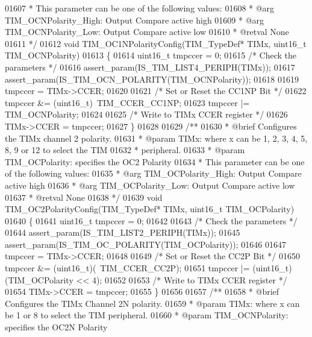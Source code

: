 \begin{DoxyCode}
01607 \textcolor{comment}{  *          This parameter can be one of the following values:}
01608 \textcolor{comment}{  *            @arg TIM\_OCNPolarity\_High: Output Compare active high}
01609 \textcolor{comment}{  *            @arg TIM\_OCNPolarity\_Low: Output Compare active low}
01610 \textcolor{comment}{  * @retval None}
01611 \textcolor{comment}{  */}
01612 \textcolor{keywordtype}{void} TIM_OC1NPolarityConfig(TIM\_TypeDef* TIMx, uint16\_t TIM\_OCNPolarity)
01613 \{
01614   uint16\_t tmpccer = 0;
01615   \textcolor{comment}{/* Check the parameters */}
01616   assert_param(IS\_TIM\_LIST4\_PERIPH(TIMx));
01617   assert_param(IS\_TIM\_OCN\_POLARITY(TIM\_OCNPolarity));
01618 
01619   tmpccer = TIMx->CCER;
01620 
01621   \textcolor{comment}{/* Set or Reset the CC1NP Bit */}
01622   tmpccer &= (uint16\_t)~TIM_CCER_CC1NP;
01623   tmpccer |= TIM\_OCNPolarity;
01624 
01625   \textcolor{comment}{/* Write to TIMx CCER register */}
01626   TIMx->CCER = tmpccer;
01627 \}
01628 
01629 \textcolor{comment}{/**}
01630 \textcolor{comment}{  * @brief  Configures the TIMx channel 2 polarity.}
01631 \textcolor{comment}{  * @param  TIMx: where x can be 1, 2, 3, 4, 5, 8, 9 or 12 to select the TIM }
01632 \textcolor{comment}{  *         peripheral.}
01633 \textcolor{comment}{  * @param  TIM\_OCPolarity: specifies the OC2 Polarity}
01634 \textcolor{comment}{  *          This parameter can be one of the following values:}
01635 \textcolor{comment}{  *            @arg TIM\_OCPolarity\_High: Output Compare active high}
01636 \textcolor{comment}{  *            @arg TIM\_OCPolarity\_Low: Output Compare active low}
01637 \textcolor{comment}{  * @retval None}
01638 \textcolor{comment}{  */}
01639 \textcolor{keywordtype}{void} TIM_OC2PolarityConfig(TIM\_TypeDef* TIMx, uint16\_t TIM\_OCPolarity)
01640 \{
01641   uint16\_t tmpccer = 0;
01642 
01643   \textcolor{comment}{/* Check the parameters */}
01644   assert_param(IS\_TIM\_LIST2\_PERIPH(TIMx));
01645   assert_param(IS\_TIM\_OC\_POLARITY(TIM\_OCPolarity));
01646 
01647   tmpccer = TIMx->CCER;
01648 
01649   \textcolor{comment}{/* Set or Reset the CC2P Bit */}
01650   tmpccer &= (uint16\_t)(~TIM_CCER_CC2P);
01651   tmpccer |= (uint16\_t)(TIM\_OCPolarity << 4);
01652 
01653   \textcolor{comment}{/* Write to TIMx CCER register */}
01654   TIMx->CCER = tmpccer;
01655 \}
01656 
01657 \textcolor{comment}{/**}
01658 \textcolor{comment}{  * @brief  Configures the TIMx Channel 2N polarity.}
01659 \textcolor{comment}{  * @param  TIMx: where x can be 1 or 8 to select the TIM peripheral.}
01660 \textcolor{comment}{  * @param  TIM\_OCNPolarity: specifies the OC2N Polarity}

\end{DoxyCode}
